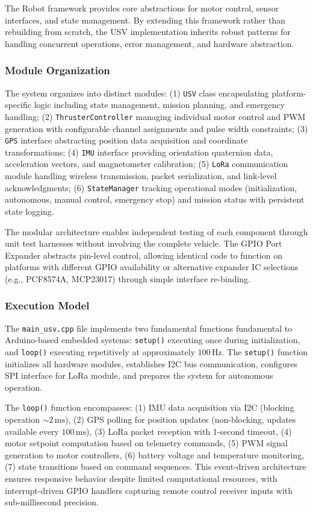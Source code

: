 \documentclass[conference]{IEEEtran}
\begin{document}
The Robot framework provides core abstractions for motor control, sensor interfaces, and state management. By extending this framework rather than rebuilding from scratch, the USV implementation inherits robust patterns for handling concurrent operations, error management, and hardware abstraction.

\subsubsection{Module Organization}
The system organizes into distinct modules: (1) \texttt{USV} class encapsulating platform-specific logic including state management, mission planning, and emergency handling; (2) \texttt{ThrusterController} managing individual motor control and PWM generation with configurable channel assignments and pulse width constraints; (3) \texttt{GPS} interface abstracting position data acquisition and coordinate transformations; (4) \texttt{IMU} interface providing orientation quaternion data, acceleration vectors, and magnetometer calibration; (5) \texttt{LoRa} communication module handling wireless transmission, packet serialization, and link-level acknowledgments; (6) \texttt{StateManager} tracking operational modes (initialization, autonomous, manual control, emergency stop) and mission status with persistent state logging.

The modular architecture enables independent testing of each component through unit test harnesses without involving the complete vehicle. The GPIO Port Expander abstracts pin-level control, allowing identical code to function on platforms with different GPIO availability or alternative expander IC selections (e.g., PCF8574A, MCP23017) through simple interface re-binding.

\subsubsection{Execution Model}
The \texttt{main\_usv.cpp} file implements two fundamental functions fundamental to Arduino-based embedded systems: \texttt{setup()} executing once during initialization, and \texttt{loop()} executing repetitively at approximately $100 \, \mathrm{Hz}$. The \texttt{setup()} function initializes all hardware modules, establishes I2C bus communication, configures SPI interface for LoRa module, and prepares the system for autonomous operation.

The \texttt{loop()} function encompasses: (1) IMU data acquisition via I2C (blocking operation $\sim 2 \, \mathrm{ms}$), (2) GPS polling for position updates (non-blocking, updates available every $100 \, \mathrm{ms}$), (3) LoRa packet reception with 1-second timeout, (4) motor setpoint computation based on telemetry commands, (5) PWM signal generation to motor controllers, (6) battery voltage and temperature monitoring, (7) state transitions based on command sequences. This event-driven architecture ensures responsive behavior despite limited computational resources, with interrupt-driven GPIO handlers capturing remote control receiver inputs with sub-millisecond precision.
\end{document}
